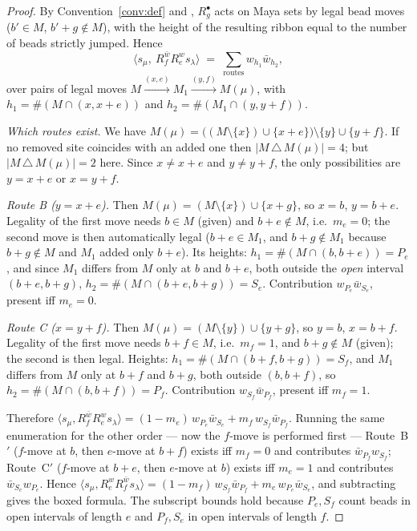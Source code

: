 \documentclass[11pt]{article}
\theoremstyle{definition}
\begin{document}
\begin{proof}
By Convention~\ref{conv:def} and \cite[Lem.~4]{Clio0906}, $R_g^{\bullet}$ acts on Maya
sets by legal bead moves ($b'\in M$, $b'+g\notin M$), with the height of the resulting
ribbon equal to the number of beads strictly jumped.  Hence
\[
   \bigl\langle s_\mu,\ R_f^{\bar w}R_e^{w}s_\lambda\bigr\rangle
   \;=\;\sum_{\text{routes}} w_{h_1}\bar w_{h_2},
\]
over pairs of legal moves $M\xrightarrow{(x,e)}M_1\xrightarrow{(y,f)}M(\mu)$, with
$h_1=\#(M\cap(x,x+e))$ and $h_2=\#(M_1\cap(y,y+f))$.

\emph{Which routes exist.}  We have
$M(\mu)=\bigl((M\setminus\{x\})\cup\{x+e\}\bigr)\setminus\{y\}\cup\{y+f\}$.  If no
removed site coincides with an added one then $|M\,\triangle\,M(\mu)|=4$; but
$|M\,\triangle\,M(\mu)|=2$ here.  Since $x\ne x+e$ and $y\ne y+f$, the only
possibilities are $y=x+e$ or $x=y+f$.

\emph{Route B ($y=x+e$).}  Then $M(\mu)=(M\setminus\{x\})\cup\{x+g\}$, so $x=b$,
$y=b+e$.  Legality of the first move needs $b\in M$ (given) and $b+e\notin M$, i.e.\
$m_e=0$; the second move is then automatically legal ($b+e\in M_1$, and
$b+g\notin M_1$ because $b+g\notin M$ and $M_1$ added only $b+e$).  Its heights:
$h_1=\#(M\cap(b,b+e))=P_e$, and since $M_1$ differs from $M$ only at $b$ and $b+e$, both
outside the \emph{open} interval $(b+e,b+g)$, $h_2=\#(M\cap(b+e,b+g))=S_e$.  Contribution
$w_{P_e}\bar w_{S_e}$, present iff $m_e=0$.

\emph{Route C ($x=y+f$).}  Then $M(\mu)=(M\setminus\{y\})\cup\{y+g\}$, so $y=b$,
$x=b+f$.  Legality of the first move needs $b+f\in M$, i.e.\ $m_f=1$, and
$b+g\notin M$ (given); the second is then legal.  Heights:
$h_1=\#(M\cap(b+f,b+g))=S_f$, and $M_1$ differs from $M$ only at $b+f$ and $b+g$, both
outside $(b,b+f)$, so $h_2=\#(M\cap(b,b+f))=P_f$.  Contribution
$w_{S_f}\bar w_{P_f}$, present iff $m_f=1$.

Therefore
$\langle s_\mu,R_f^{\bar w}R_e^{w}s_\lambda\rangle
 =(1-m_e)\,w_{P_e}\bar w_{S_e}+m_f\,w_{S_f}\bar w_{P_f}$.
Running the same enumeration for the other order --- now the $f$-move is performed first
--- Route~B$'$ ($f$-move at $b$, then $e$-move at $b+f$) exists iff $m_f=0$ and
contributes $\bar w_{P_f}w_{S_f}$; Route~C$'$ ($f$-move at $b+e$, then $e$-move at $b$)
exists iff $m_e=1$ and contributes $\bar w_{S_e}w_{P_e}$.  Hence
$\langle s_\mu,R_e^{w}R_f^{\bar w}s_\lambda\rangle
 =(1-m_f)\,w_{S_f}\bar w_{P_f}+m_e\,w_{P_e}\bar w_{S_e}$, and subtracting gives the
boxed formula.  The subscript bounds hold because $P_e,S_f$ count beads in open intervals
of length $e$ and $P_f,S_e$ in open intervals of length $f$.
\end{proof}
\end{document}
